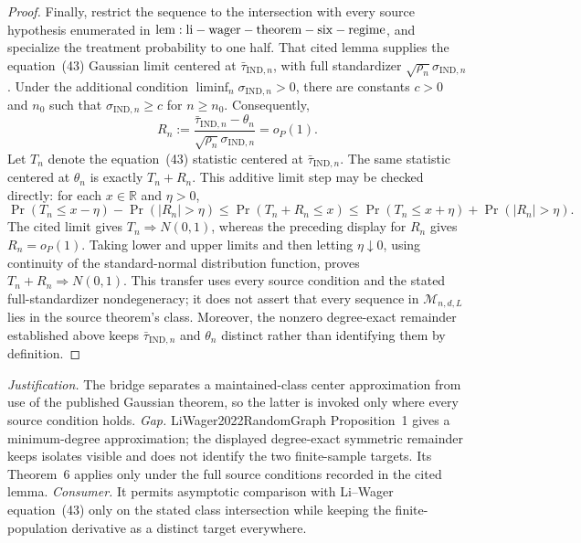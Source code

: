 \documentclass{article}
\begin{document}
\begin{proof}
Finally, restrict the sequence to the intersection with every source hypothesis enumerated in \({\rm lem:li-wager-theorem-six-regime}\), and specialize the treatment probability to one half.  That cited lemma supplies the equation~(43) Gaussian limit centered at \(\bar\tau_{\mathrm{IND},n}\), with full standardizer \(\sqrt{\rho_n}\sigma_{\mathrm{IND},n}\).  Under the additional condition \(\liminf_n\sigma_{\mathrm{IND},n}>0\), there are constants \(c>0\) and \(n_0\) such that \(\sigma_{\mathrm{IND},n}\ge c\) for \(n\ge n_0\).  Consequently,
\[
 R_n:=\frac{\bar\tau_{\mathrm{IND},n}-\theta_n}
 {\sqrt{\rho_n}\sigma_{\mathrm{IND},n}}=o_P(1).
\]
Let \(T_n\) denote the equation~(43) statistic centered at \(\bar\tau_{\mathrm{IND},n}\).  The same statistic centered at \(\theta_n\) is exactly \(T_n+R_n\).  This additive limit step may be checked directly: for each \(x\in\mathbb R\) and \(\eta>0\),
\[
 \Pr(T_n\le x-\eta)-\Pr(|R_n|>\eta)
 \le\Pr(T_n+R_n\le x)
 \le\Pr(T_n\le x+\eta)+\Pr(|R_n|>\eta).
\]
The cited limit gives \(T_n\Rightarrow N(0,1)\), whereas the preceding display for \(R_n\) gives \(R_n=o_P(1)\).  Taking lower and upper limits and then letting \(\eta\downarrow0\), using continuity of the standard-normal distribution function, proves \(T_n+R_n\Rightarrow N(0,1)\).  This transfer uses every source condition and the stated full-standardizer nondegeneracy; it does not assert that every sequence in \(\mathcal M_{n,d,L}\) lies in the source theorem's class.  Moreover, the nonzero degree-exact remainder established above keeps \(\bar\tau_{\mathrm{IND},n}\) and \(\theta_n\) distinct rather than identifying them by definition.
\end{proof}
\par\smallskip\noindent \textit{Justification.} The bridge separates a maintained-class center approximation from use of the published Gaussian theorem, so the latter is invoked only where every source condition holds. \textit{Gap.} LiWager2022RandomGraph Proposition~1 gives a minimum-degree approximation; the displayed degree-exact symmetric remainder keeps isolates visible and does not identify the two finite-sample targets. Its Theorem~6 applies only under the full source conditions recorded in the cited lemma. \textit{Consumer.} It permits asymptotic comparison with Li--Wager equation~(43) only on the stated class intersection while keeping the finite-population derivative as a distinct target everywhere.
\end{document}
